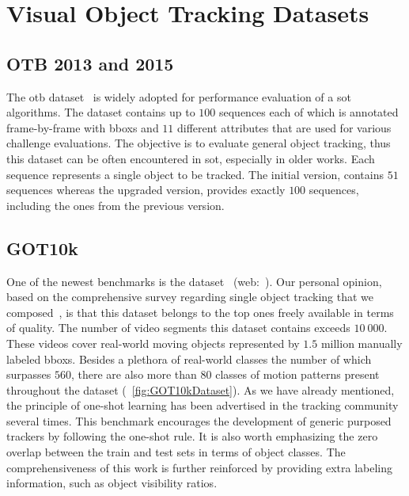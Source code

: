\section{Visual Object Tracking Datasets}

\subsection{OTB 2013 and 2015}
\label{ssec:OTB20132015Dataset}

The \gls{otb} dataset~\cite{wu2015otb} is widely adopted for performance evaluation of a \gls{sot} algorithms. The dataset contains up to $100$ sequences each of which is annotated frame-by-frame with \glspl{bbox} and $11$ different attributes that are used for various challenge evaluations. The objective is to evaluate general object tracking, thus this dataset can be often encountered in \gls{sot}, especially in older works. Each sequence represents a single object to be tracked. The initial version, \otbthirteen{} contains $51$ sequences whereas the upgraded version, \otbfifteen{} provides exactly $100$ sequences, including the ones from the previous version.

\subsection{GOT10k}
\label{ssec:GOT10kDataset}

One of the newest benchmarks is the \gottenk{} dataset~\cite{huang2021got10k} (web:~\cite{webgot10kdataset}). Our personal opinion, based on the comprehensive survey regarding single object tracking that we composed~\cite{ondrasovic2021siamese}, is that this dataset belongs to the top ones freely available in terms of quality. The number of video segments this dataset contains exceeds $10\ 000$. These videos cover real-world moving objects represented by $1.5$ million manually labeled \glspl{bbox}. Besides a plethora of real-world classes the number of which surpasses $560$, there are also more than $80$ classes of motion patterns present throughout the dataset (\figtext{}~\ref{fig:GOT10kDataset}).
As we have already mentioned, the principle of one-shot learning has been advertised in the tracking community several times. This benchmark encourages the development of generic purposed trackers by following the one-shot rule. It is also worth emphasizing the zero overlap between the train and test sets in terms of object classes. The comprehensiveness of this work is further reinforced by providing extra labeling information, such as object visibility ratios.

